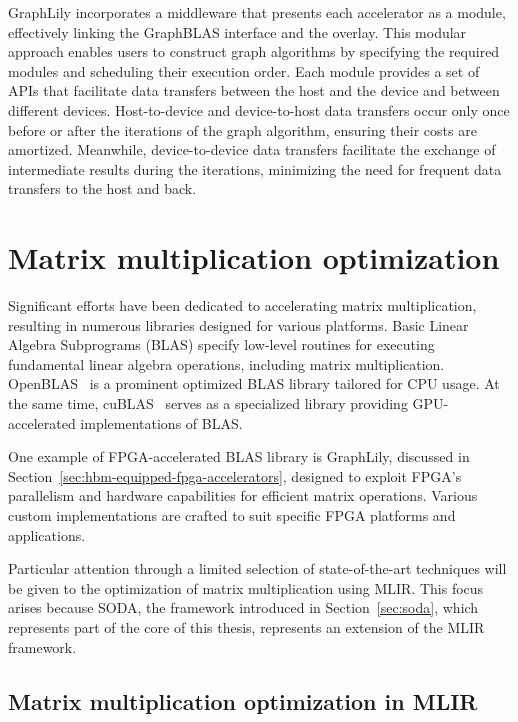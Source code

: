 GraphLily incorporates a middleware that presents each accelerator as a module, effectively linking the GraphBLAS interface and the overlay.
This modular approach enables users to construct graph algorithms by specifying the required modules and scheduling their execution order.
Each module provides a set of APIs that facilitate data transfers between the host and the device and between different devices.
Host-to-device and device-to-host data transfers occur only once before or after the iterations of the graph algorithm, ensuring their costs are amortized.
Meanwhile, device-to-device data transfers facilitate the exchange of intermediate results during the iterations, minimizing the need for frequent data transfers to the host and back.

\section{Matrix multiplication optimization}
\label{sec:matmul-optimization}%

Significant efforts have been dedicated to accelerating matrix multiplication, resulting in numerous libraries designed for various platforms.
Basic Linear Algebra Subprograms (BLAS) specify low-level routines for executing fundamental linear algebra operations, including matrix multiplication.
OpenBLAS~\cite{openblas} is a prominent optimized BLAS library tailored for CPU usage.
At the same time, cuBLAS~\cite{cublas} serves as a specialized library providing GPU-accelerated implementations of BLAS\@.

One example of FPGA-accelerated BLAS library is GraphLily, discussed in Section~\ref{sec:hbm-equipped-fpga-accelerators}, designed to exploit FPGA's parallelism and hardware capabilities for efficient matrix operations.
Various custom implementations are crafted to suit specific FPGA platforms and applications.

Particular attention through a limited selection of state-of-the-art techniques will be given to the optimization of matrix multiplication using MLIR\@.
This focus arises because SODA, the framework introduced in Section~\ref{sec:soda}, which represents part of the core of this thesis, represents an extension of the MLIR framework.

\subsection{Matrix multiplication optimization in MLIR}
\label{subsec:matmul-opt-mlir}%

